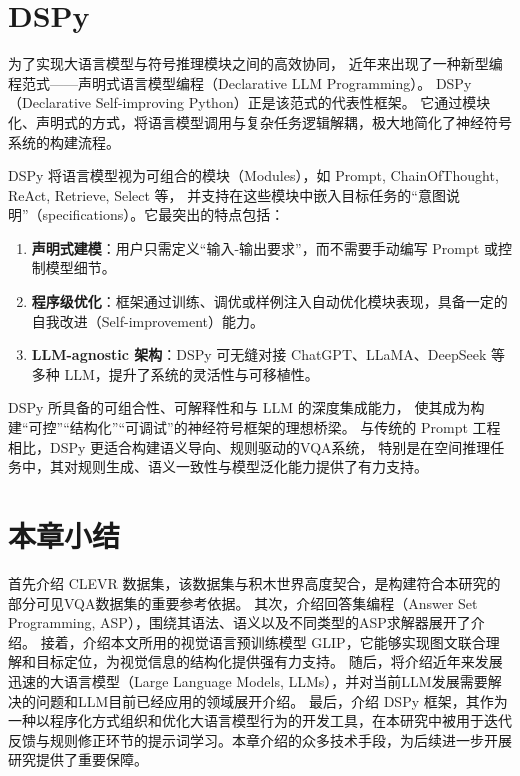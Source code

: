 \section{DSPy}
为了实现大语言模型与符号推理模块之间的高效协同，
近年来出现了一种新型编程范式——声明式语言模型编程（Declarative LLM Programming）。
DSPy（Declarative Self-improving Python）正是该范式的代表性框架。
它通过模块化、声明式的方式，将语言模型调用与复杂任务逻辑解耦，极大地简化了神经符号系统的构建流程。

DSPy 将语言模型视为可组合的模块（Modules），如 Prompt, ChainOfThought, ReAct, Retrieve, Select 等，
并支持在这些模块中嵌入目标任务的“意图说明”（specifications）。它最突出的特点包括：
\begin{enumerate}[nosep]
\item \textbf{声明式建模}：用户只需定义“输入-输出要求”，而不需要手动编写 Prompt 或控制模型细节。
\item \textbf{程序级优化}：框架通过训练、调优或样例注入自动优化模块表现，具备一定的自我改进（Self-improvement）能力。
\item \textbf{LLM-agnostic 架构}：DSPy 可无缝对接 ChatGPT、LLaMA、DeepSeek 等多种 LLM，提升了系统的灵活性与可移植性。
\end{enumerate}

DSPy 所具备的可组合性、可解释性和与 LLM 的深度集成能力，
使其成为构建“可控”“结构化”“可调试”的神经符号框架的理想桥梁。
与传统的 Prompt 工程相比，DSPy 更适合构建语义导向、规则驱动的VQA系统，
特别是在空间推理任务中，其对规则生成、语义一致性与模型泛化能力提供了有力支持。
\section{本章小结}
首先介绍 CLEVR 数据集，该数据集与积木世界高度契合，是构建符合本研究的部分可见VQA数据集的重要参考依据。
其次，介绍回答集编程（Answer Set Programming, ASP），围绕其语法、语义以及不同类型的ASP求解器展开了介绍。
接着，介绍本文所用的视觉语言预训练模型 GLIP，它能够实现图文联合理解和目标定位，为视觉信息的结构化提供强有力支持。
随后，将介绍近年来发展迅速的大语言模型（Large Language Models, LLMs），并对当前LLM发展需要解决的问题和LLM目前已经应用的领域展开介绍。
最后，介绍 DSPy 框架，其作为一种以程序化方式组织和优化大语言模型行为的开发工具，在本研究中被用于迭代反馈与规则修正环节的提示词学习。本章介绍的众多技术手段，为后续进一步开展研究提供了重要保障。